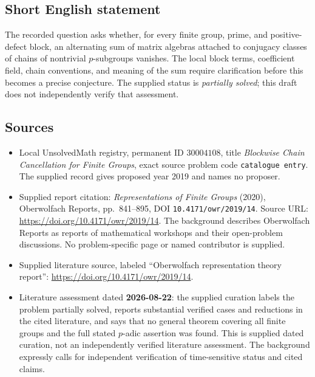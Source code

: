 \documentclass[11pt]{article}
\begin{document}
\subsection{Short English statement}
The recorded question asks whether, for every finite group, prime, and positive-defect block, an alternating sum of matrix algebras attached to conjugacy classes of chains of nontrivial \(p\)-subgroups vanishes. The local block terms, coefficient field, chain conventions, and meaning of the sum require clarification before this becomes a precise conjecture. The supplied status is \emph{partially solved}; this draft does not independently verify that assessment.
\subsection{Sources}
\begin{itemize}
\item Local UnsolvedMath registry, permanent ID \(30004108\), title \emph{Blockwise Chain Cancellation for Finite Groups}, exact source problem code \texttt{catalogue entry}. The supplied record gives proposed year 2019 and names no proposer.
\item Supplied report citation: \emph{Representations of Finite Groups} (2020), Oberwolfach Reports, pp.\ 841--895, DOI \texttt{10.4171/owr/2019/14}. Source URL: \url{https://doi.org/10.4171/owr/2019/14}. The background describes Oberwolfach Reports as reports of mathematical workshops and their open-problem discussions. No problem-specific page or named contributor is supplied.
\item Supplied literature source, labeled ``Oberwolfach representation theory report'': \url{https://doi.org/10.4171/owr/2019/14}.
\item Literature assessment dated \textbf{2026-08-22}: the supplied curation labels the problem partially solved, reports substantial verified cases and reductions in the cited literature, and says that no general theorem covering all finite groups and the full stated \(p\)-adic assertion was found. This is supplied dated curation, not an independently verified literature assessment. The background expressly calls for independent verification of time-sensitive status and cited claims.
\end{itemize}
\end{document}
